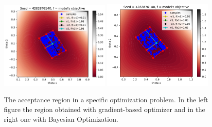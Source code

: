 \documentclass[nojss]{jss}
\begin{document}
\begin{figure}[ht]
    \begin{center}
        \includegraphics[width=0.49\textwidth]{./images/chapter4/ma2_region_1.pdf}
        \includegraphics[width=0.49\textwidth]{./images/chapter4/ma2_region_1_bo.pdf}
    \end{center}
  \caption[The acceptance region of a specific deterministic simulator.]{The acceptance region in a specific optimization problem. In the left figure the region obtained with gradient-based optimizer and in the right one with Bayesian Optimization.}
  \label{fig:ma2_5}
\end{figure}
\end{document}
